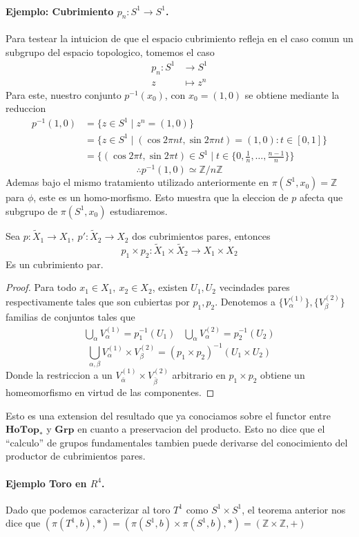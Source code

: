 \paragraph{Ejemplo: Cubrimiento \(p_n : S^1 \to S^1\).} Para testear la intuicion
de que el espacio cubrimiento refleja en el caso comun un subgrupo del
espacio topologico, tomemos el caso
\begin{align*}
  p_n : S^1 &\longrightarrow S^1 \\
  z &\longmapsto z^n
\end{align*}
Para este, nuestro conjunto \(p^{-1} (x_0)\), con \(x_0 = (1,0)\) se
obtiene mediante la reduccion
\begin{align*}
  p^{-1} (1,0)
    &= \{ z \in S^1 \mid z^n = (1,0)\} \\
    &= \{z \in S^1 \mid (\cos 2 \pi n t, \sin 2 \pi n t) = (1,0) :
           t \in [0,1] \} \\
    &= \{(\cos 2 \pi t, \sin 2 \pi t) \in S^1 \mid
           t \in \{0, \frac 1 n , \dotsc , \frac {n-1} n \} \}
\end{align*}
\[ \therefore p^{-1}(1,0) \simeq \mathbb Z / n \mathbb Z \]
Ademas bajo el mismo tratamiento utilizado anteriormente en \(\pi (S^1,
x_0) = \mathbb Z\) para \(\phi\), este es un homo-morfismo. Esto muestra
que la eleccion de \(p\) afecta que subgrupo de \(\pi (S^1, x_0)\) estudiaremos.
\begin{teorema}
  Sea \(p : \tilde X _1 \to X_1,\ p' : \tilde X _2 \to X_2 \) dos
  cubrimientos pares, entonces
  \[ p_1 \times p_2 : \tilde X _1 \times \tilde X _2 \to X_1 \times X_2 \]
  Es un cubrimiento par.
\end{teorema}
\begin{proof}
  Para todo \(x_1 \in X_1,\ x_2 \in X_2\), existen \(U_1, U_2\)
  vecindades pares respectivamente tales que son cubiertas por \(p_1,
  p_2\). Denotemos a \(\{V_\alpha^{(1)}\}, \{V_\beta^{(2)}\}\) familias
  de conjuntos tales que
  \[
    \begin{matrix}
      \bigcup_{\alpha} V_\alpha^{(1)} = p_1^{-1} (U_1) &
      \bigcup_{\alpha} V_\alpha^{(2)} = p_2^{-1} (U_2)
    \end{matrix}
  \]
  \[ \bigcup_{\alpha, \beta} V_\alpha^{(1)} \times V_\beta^{(2)} = (p_1
    \times p_2)^{-1} (U_1 \times U_2)\]
  Donde la restriccion a un \(V_{\bar{\alpha}}^{(1)} \times
  V_{\bar{\beta}}^{(2)}\) arbitrario en \(p_1 \times p_2\) obtiene un
  homeomorfismo en virtud de las componentes.
\end{proof}

Esto es una extension del resultado que ya conociamos sobre el functor
entre \(\mathbf{HoTop}_{*}\) y \(\mathbf{Grp}\) en cuanto a preservacion
del producto. Esto no dice que el ``calculo'' de grupos fundamentales
tambien puede derivarse del conocimiento del productor de cubrimientos
pares.

\paragraph{Ejemplo Toro en \(R^4\).} Dado que podemos caracterizar al
toro \(T^1\) como \(S^1 \times S^1\), el teorema anterior nos dice que
\((\pi (T^1, b), *) = (\pi (S^1, b) \times \pi (S^1, b), *) = (\mathbb Z
\times \mathbb Z, +) \)